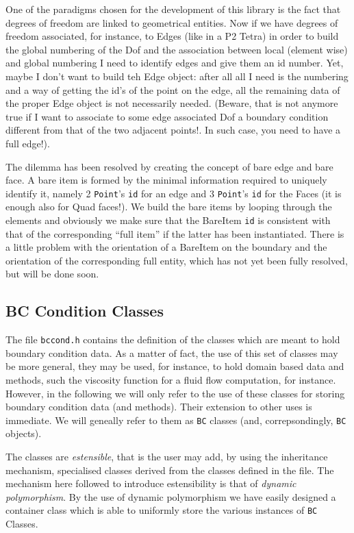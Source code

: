 One of the paradigms chosen for the development of this library is the
fact that degrees of freedom are linked to geometrical entities.  Now
if we have degrees of freedom associated, for instance, to Edges (like
in a P2 Tetra) in order to build the global numbering of the Dof and
the association between local (element wise) and global numbering I
need to identify edges and give them an id number. Yet, maybe I don't want to
build teh Edge object: after all all I need is the numbering and a
way of getting the id's of the point on the edge, all the remaining data 
of the proper Edge object is not necessarily needed. (Beware, that is not anymore true
if I want to associate to some edge associated Dof a boundary condition
different from that of the two adjacent points!. In such case, you need to
have a full edge!).

The dilemma has been resolved by creating the concept of bare edge and
bare face.  A bare item is formed by the minimal information required
to uniquely identify it, namely 2 \texttt{Point}'s \texttt{id} for an
edge and 3 \texttt{Point}'s \texttt{id} for the Faces (it is enough
also for Quad faces!). We build the bare items by looping through the
elements and obviously we make sure that the BareItem \texttt{id} is
consistent with that of the corresponding ``full item'' if the latter
has been instantiated.  There is a little problem with the orientation
of a BareItem on the boundary and the orientation of the corresponding
full entity, which has not yet been fully resolved, but will be done
soon.
\subsection{BC Condition Classes}
The file \texttt{bccond.h} contains the definition of the classes
which are meant to hold boundary condition data. As a matter of fact,
the use of this set of classes may be more general, they may be used,
for instance, to hold domain based data and methods, such the
viscosity function for a fluid flow computation, for instance.
However, in the following we will only refer to the use of these
classes for storing boundary condition data (and methods). Their extension
to other uses is immediate.
We will geneally refer to them as \texttt{BC} classes (and, correpsondingly,
\texttt{BC} objects).

The classes are \emph{estensible}, that is the user may add, by using
the inheritance mechanism, specialised classes derived from the
classes defined in the file. The mechanism here followed to introduce
estensibility is that of \emph{dynamic polymorphism}. By the use of
dynamic polymorphism we have easily designed a container class which
is able to uniformly store the various instances of \texttt{BC}
Classes.

